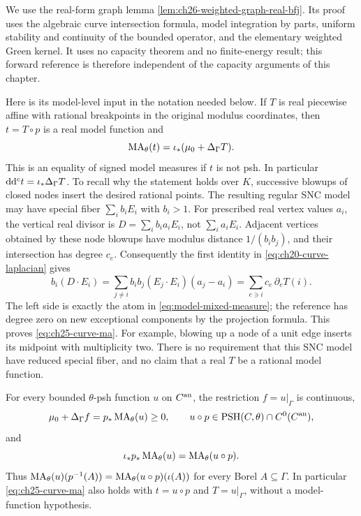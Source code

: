 We use the real-form graph lemma
\cref{lem:ch26-weighted-graph-real-bfj}.  Its proof uses the algebraic
curve intersection formula, model integration by parts, uniform
stability and continuity of the bounded operator, and the elementary
weighted Green kernel.  It uses no capacity theorem and no
finite-energy result; this forward reference is therefore independent
of the capacity arguments of this chapter.

Here is its model-level input in the notation needed below.  If \(T\)
is real piecewise affine with rational breakpoints in the original
modulus coordinates, then \(t=T\circ p\) is a real model function and
\begin{equation}
\label{eq:ch25-curve-ma}
 \operatorname{MA}_\theta(t)=\iota_*(\mu_0+\Delta_\Gamma T).
\end{equation}
This is an equality of signed model measures if \(t\) is not psh.
In particular \(\mathrm d\mathrm d^c t=\iota_*\Delta_\Gamma T\).  To recall why the
statement holds over \(K\), successive blowups of closed nodes insert
the desired rational points.  The resulting regular SNC model may
have special fiber \(\sum_i b_iE_i\) with \(b_i>1\).
For prescribed real vertex values \(a_i\), the vertical real divisor
is \(D=\sum_i b_i a_iE_i\), not \(\sum_i a_iE_i\).
Adjacent vertices obtained by these node blowups have modulus
distance \(1/(b_i b_j)\), and their intersection has degree \(c_e\).
Consequently the first identity in
\eqref{eq:ch20-curve-laplacian} gives
\[
 b_i(D\cdot E_i)
   =\sum_{j\ne i}b_i b_j(E_j\cdot E_i)(a_j-a_i)
   =\sum_{e\ni i}c_e\,\partial_eT(i).
\]
The left side is exactly the atom in
\eqref{eq:model-mixed-measure}; the reference has degree zero on
new exceptional components by the projection formula.  This proves
\eqref{eq:ch25-curve-ma}.  For example, blowing up a node of a unit
edge inserts its midpoint with multiplicity two.  There is no
requirement that this SNC model have reduced special fiber, and no
claim that a real \(T\) be a rational model function.

\begin{proposition}
\label{prop:ch25-curve-pushforward}
For every bounded \(\theta\)-psh function \(u\) on \(C^{\mathrm{an}}\), the
restriction \(f=u|_\Gamma\) is continuous,
\[
 \mu_0+\Delta_\Gamma f=p_*\operatorname{MA}_\theta(u)\geq0,
 \qquad u\circ p\in\operatorname{PSH}(C,\theta)\cap C^0(C^{\mathrm{an}}),
\]
and
\begin{equation}
\label{eq:ch25-curve-pushforward}
 \iota_*p_*\operatorname{MA}_\theta(u)=\operatorname{MA}_\theta(u\circ p).
\end{equation}
Thus \(\operatorname{MA}_\theta(u)(p^{-1}(A))
=\operatorname{MA}_\theta(u\circ p)(\iota(A))\) for every Borel
\(A\subseteq\Gamma\).  In particular
\eqref{eq:ch25-curve-ma} also holds with \(t=u\circ p\) and
\(T=u|_\Gamma\), without a model-function hypothesis.
\end{proposition}

